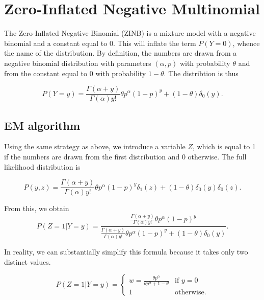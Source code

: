 \documentclass[12pt]{article}
\begin{document}
    \section{Zero-Inflated Negative Multinomial}

    The Zero-Inflated Negative Binomial (ZINB) is a mixture model
    with a negative binomial and a constant equal to 0. This will
    inflate the term $P(Y=0)$, whence the name of the distribution.
    By definition, the numbers are drawn from a negative binomial
    distribution with parameters $(\alpha, p)$ with probability
    $\theta$ and from the constant equal to 0 with probability
    $1-\theta$. The distribtion is thus

    \begin{equation*}
\label{ZINB}
    P(Y = y) = \frac{\Gamma(\alpha+y)}{\Gamma(\alpha)y!}
    \theta p^{\alpha}(1-p)^y + (1-\theta)\delta_0(y).
    \end{equation*}

    \subsection{EM algorithm}
    Using the same strategy as above, we introduce a variable $Z$,
    which is equal to 1 if the numbers are drawn from the first
    distribution and 0 otherwise. The full likelihood distribution
    is

    \begin{equation*}
    P(y,z) = \frac{\Gamma(\alpha+y)}{\Gamma(\alpha)y!}
    \theta p^{\alpha}(1-p)^y\delta_1(z) +
    (1-\theta)\delta_0(y)\delta_0(z).
    \end{equation*}

    From this, we obtain
    \begin{equation*}
    P(Z=1|Y=y) =\frac{\frac{\Gamma(\alpha+y)}{\Gamma(\alpha)y!}
    \theta p^{\alpha}(1-p)^y}{
    \frac{\Gamma(\alpha+y)}{\Gamma(\alpha)y!}
    \theta p^{\alpha}(1-p)^y + (1-\theta)\delta_0(y)}.
    \end{equation*}

    In reality, we can substantially simplify this formula because
    it takes only two distinct values.

    \begin{equation*}
    P(Z=1|Y=y) = \left\{
      \begin{array}{ll}
        w = \frac{\theta p^{\alpha}}{\theta p^{\alpha}+1-\theta}
        & \mbox{if } y = 0\\
        1 & \mbox{otherwise.}
      \end{array}
    \right.
    \end{equation*}
\end{document}
